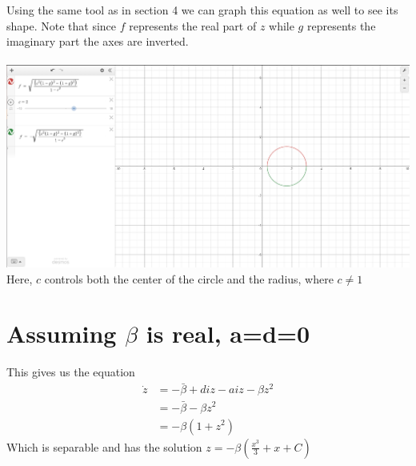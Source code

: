\documentclass[10pt]{article}
\begin{document}
Using the same tool as in section 4 we can graph this equation as well to see its shape. Note that since $f$ represents the real part of $z$ while $g$ represents the imaginary part the axes are inverted.\\\\
\includegraphics[width=\textwidth]{Figure3}\\
Here, $c$ controls both the center of the circle and the radius, where $c\neq1$



\section{Assuming $\beta$ is real, a=d=0}
This gives us the equation
\begin{align*}
\dot z&=-\bar\beta+diz-aiz-\beta z^2\\
&=-\bar\beta-\beta z^2\\
&=-\beta(1+z^2)
\end{align*}
Which is separable and has the solution $z=-\beta\left(\frac{x^3}3+x+C\right)$
\end{document}
